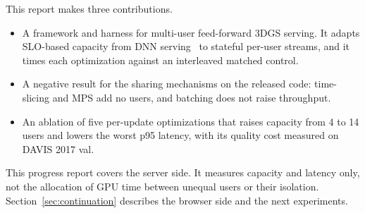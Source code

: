 This report makes three contributions.
\begin{itemize}
\item A framework and harness for multi-user feed-forward 3DGS serving.
It adapts SLO-based capacity from DNN serving~\cite{clockwork2020} to stateful per-user streams, and it times each optimization against an interleaved matched control.
\item A negative result for the sharing mechanisms on the released code: time-slicing and MPS add no users, and batching does not raise throughput.
\item An ablation of five per-update optimizations that raises capacity from 4 to 14 users and lowers the worst p95 latency, with its quality cost measured on DAVIS 2017 val. %
\end{itemize}
This progress report covers the server side.
It measures capacity and latency only, not the allocation of GPU time between unequal users or their isolation.
Section~\ref{sec:continuation} describes the browser side and the next experiments.
